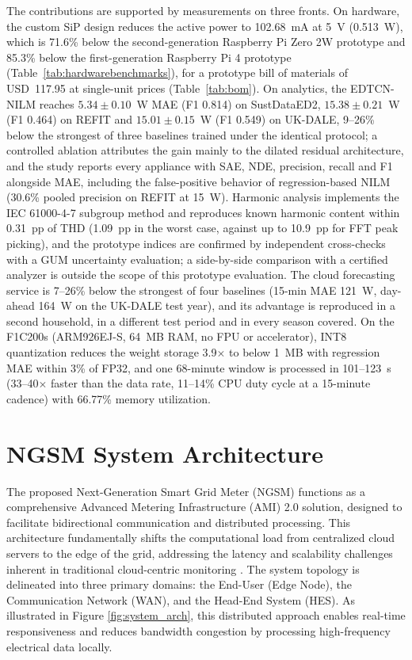 \documentclass[fleqn,10pt]{wlscirep}
\begin{document}
The contributions are supported by measurements on three fronts. On hardware, the custom SiP design reduces the active power to 102.68~mA at 5~V (0.513~W), which is 71.6\% below the second-generation Raspberry Pi Zero 2W prototype and 85.3\% below the first-generation Raspberry Pi 4 prototype (Table~\ref{tab:hardwarebenchmarks}), for a prototype bill of materials of USD~117.95 at single-unit prices (Table~\ref{tab:bom}). On analytics, the EDTCN-NILM reaches $5.34\pm0.10$~W MAE (F1 0.814) on SustDataED2, $15.38\pm0.21$~W (F1 0.464) on REFIT and $15.01\pm0.15$~W (F1 0.549) on UK-DALE, 9--26\% below the strongest of three baselines trained under the identical protocol; a controlled ablation attributes the gain mainly to the dilated residual architecture, and the study reports every appliance with SAE, NDE, precision, recall and F1 alongside MAE, including the false-positive behavior of regression-based NILM (30.6\% pooled precision on REFIT at 15~W). Harmonic analysis implements the IEC 61000-4-7 subgroup method and reproduces known harmonic content within 0.31~pp of THD (1.09~pp in the worst case, against up to 10.9~pp for FFT peak picking), and the prototype indices are confirmed by independent cross-checks with a GUM uncertainty evaluation; a side-by-side comparison with a certified analyzer is outside the scope of this prototype evaluation. The cloud forecasting service is 7--26\% below the strongest of four baselines (15-min MAE 121~W, day-ahead 164~W on the UK-DALE test year), and its advantage is reproduced in a second household, in a different test period and in every season covered. On the F1C200s (ARM926EJ-S, 64~MB RAM, no FPU or accelerator), INT8 quantization reduces the weight storage 3.9$\times$ to below 1~MB with regression MAE within 3\% of FP32, and one 68-minute window is processed in 101--123~s (33--40$\times$ faster than the data rate, 11--14\% CPU duty cycle at a 15-minute cadence) with 66.77\% memory utilization.


\section{NGSM System Architecture}
\label{sec:system_arch}

The proposed Next-Generation Smart Grid Meter (NGSM) functions as a comprehensive Advanced Metering Infrastructure (AMI) 2.0 solution, designed to facilitate bidirectional communication and distributed processing. This architecture fundamentally shifts the computational load from centralized cloud servers to the edge of the grid, addressing the latency and scalability challenges inherent in traditional cloud-centric monitoring \cite{MDPI_NILM2025, ResearchGate2025}. The system topology is delineated into three primary domains: the End-User (Edge Node), the Communication Network (WAN), and the Head-End System (HES). As illustrated in Figure \ref{fig:system_arch}, this distributed approach enables real-time responsiveness and reduces bandwidth congestion by processing high-frequency electrical data locally.
\end{document}
